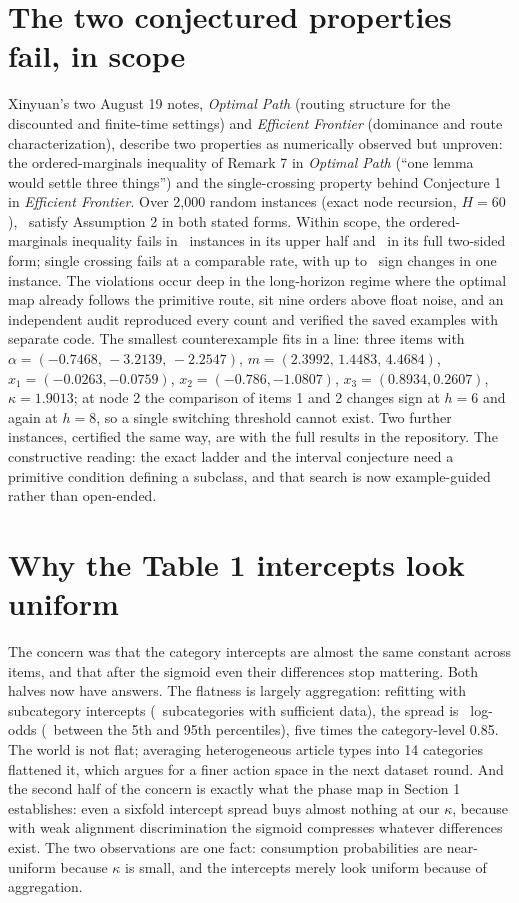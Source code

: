 \documentclass[11pt]{article}
\begin{document}
\section{The two conjectured properties fail, in scope}

Xinyuan's two August 19 notes, \emph{Optimal Path} (routing structure
for the discounted and finite-time settings) and \emph{Efficient
Frontier} (dominance and route characterization), describe two properties
as numerically observed but unproven: the ordered-marginals inequality of
Remark 7 in \emph{Optimal Path} (``one lemma would settle three
things'') and the single-crossing property behind Conjecture 1 in
\emph{Efficient Frontier}. Over 2{,}000 random instances (exact
node recursion, $H=60$),
\cxInScope\ satisfy Assumption 2 in both stated forms. Within scope, the
ordered-marginals inequality fails in \cxUpper\ instances in its upper
half and \cxTwoSided\ in its full two-sided form; single crossing fails
at a comparable rate, with up to \cxCrossMax\ sign changes
in one instance. The violations occur deep in the long-horizon regime where the optimal
map already follows the primitive route, sit
nine orders above float noise, and an independent audit reproduced every
count and verified the saved examples with separate code. The smallest counterexample fits in a line: three items with
$\alpha=(-0.7468,\,-3.2139,\,-2.2547)$,
$m=(2.3992,\,1.4483,\,4.4684)$,
$x_1=(-0.0263,-0.0759)$, $x_2=(-0.786,-1.0807)$, $x_3=(0.8934,0.2607)$,
$\kappa=1.9013$; at node 2 the comparison of items 1 and 2
changes sign at $h=6$ and again at $h=8$, so a single switching
threshold cannot exist. Two further instances, certified the same way,
are with the full results in the repository. The constructive reading: the exact ladder and the
interval conjecture need a primitive condition defining a subclass, and
that search is now example-guided rather than open-ended.


\section{Why the Table 1 intercepts look uniform}

The concern was that the category intercepts are almost the same constant
across items, and that after the sigmoid even their differences stop
mattering. Both halves now have answers. The flatness is largely
aggregation: refitting with subcategory intercepts (\subN\ subcategories
with sufficient data), the spread is \subSpread\ log-odds (\subPspread\
between the 5th and 95th percentiles), five times the category-level
0.85. The world is not flat; averaging heterogeneous article types into
14 categories flattened it, which argues for a finer action space in the
next dataset round. And the second half of the concern is exactly what
the phase map in Section 1 establishes: even a sixfold intercept spread
buys almost nothing at our $\kappa$, because with weak alignment
discrimination the sigmoid compresses whatever differences exist. The
two observations are one fact: consumption probabilities are
near-uniform because $\kappa$ is small, and the intercepts merely look
uniform because of aggregation.
\end{document}
